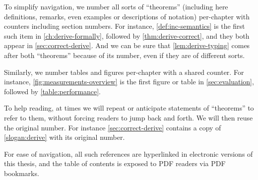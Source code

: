 To simplify navigation, we number all sorts of ``theorems'' (including here
definitions, remarks, even examples or descriptions of notation)
per-chapter with counters including section numbers. For
instance, \cref{def:inc-semantics} is the first such item in
\cref{ch:derive-formally}, followed by \cref{thm:derive-correct}, and they both
appear in \cref{sec:correct-derive}. And we can be sure that \cref{lem:derive-typing}
comes after both ``theorems'' because of its number, even if they are of different sorts.

Similarly, we number tables and figures per-chapter with a shared counter. For instance,
\cref{fig:measurements-overview} is the first figure or table in \cref{sec:evaluation},
followed by \cref{table:performance}.

To help reading, at times we will repeat or anticipate statements of
``theorems'' to refer to them, without forcing readers to jump back and forth.
We will then reuse the original number.
For instance \cref{sec:correct-derive} contains a copy of \cref{slogan:derive}
with its original number.

For ease of navigation, all such references are hyperlinked in electronic
versions of this thesis, and the table of contents is exposed to PDF readers via
PDF bookmarks.






